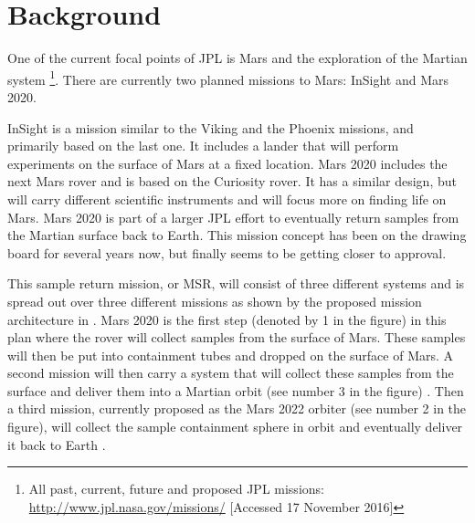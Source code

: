 \chapter{Background}

\label{ch:problembackground}
One of the current focal points of \ac{JPL} is Mars and the exploration of the Martian system \footnote{All past, current, future and proposed \ac{JPL} missions: \url{http://www.jpl.nasa.gov/missions/} [Accessed 17 November 2016]}. There are currently two planned missions to Mars: InSight and Mars 2020. 

InSight is a mission similar to the Viking and the Phoenix missions, and primarily based on the last one. It includes a lander that will perform experiments on the surface of Mars at a fixed location. Mars 2020 includes the next Mars rover and is based on the Curiosity rover. It has a similar design, but will carry different scientific instruments and will focus more on finding life on Mars. Mars 2020 is part of a larger \ac{JPL} effort to eventually return samples from the Martian surface back to Earth. This mission concept has been on the drawing board for several years now, but finally seems to be getting closer to approval. 

This sample return mission, or \ac{MSR}, will consist of three different systems and is spread out over three different missions as shown by the proposed mission architecture in . Mars 2020 is the first step (denoted by 1 in the figure) in this plan where the rover will collect samples from the surface of Mars. These samples will then be put into containment tubes and dropped on the surface of Mars. A second mission will then carry a system that will collect these samples from the surface and deliver them into a Martian orbit (see number 3 in the figure) \citep{shotwell2016drivers}. Then a third mission, currently proposed as the Mars 2022 orbiter (see number 2 in the figure), will collect the sample containment sphere in orbit and eventually deliver it back to Earth \citep{woolley2011mars}. 

